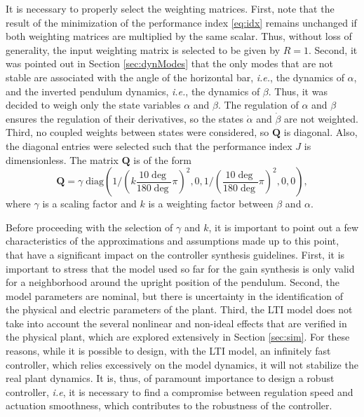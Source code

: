 \documentclass[letterpaper, 10 pt, conference]{ieeeconf}
\begin{document}
It is necessary to properly select the weighting matrices. First, note that the result of the minimization of the performance index \eqref{eq:idx} remains unchanged if both weighting matrices are multiplied by the same scalar. Thus, without loss of generality, the input weighting matrix is selected to be given by $R = 1$. Second, it was pointed out in Section \ref{sec:dynModes} that the only modes that are not stable are associated with the angle of the horizontal bar, \textit{i.e.}, the dynamics of $\alpha$, and the inverted pendulum dynamics, \textit{i.e.}, the dynamics of $\beta$. Thus, it was decided to weigh only the state variables $\alpha$ and $\beta$. The regulation of $\alpha$ and $\beta$ ensures the regulation of their derivatives, so the states $\dot{\alpha}$ and $\dot{\beta}$ are not weighted. Third, no coupled weights between states were considered, so $\mathbf{Q}$ is diagonal. Also, the diagonal entries were selected such that the performance index $J$ is dimensionless. The matrix $\mathbf{Q}$ is of the form
\begin{equation*}
    \mathbf{Q}\!=\! \gamma\; \mathrm{diag}\!\!\left(1/{\left(k\frac{10\deg}{180 \deg} \pi\right)^2}\!\!,0,{1}/{\left(\frac{10\deg}{180 \deg} \pi\right)^2}\!\!,0,0\!\right),
\end{equation*}
where $\gamma$ is a scaling factor and $k$ is a weighting factor between $\beta$ and $\alpha$.

Before proceeding with the selection of $\gamma$ and $k$, it is important to point out a few characteristics of the approximations and assumptions made up to this point, that have a significant impact on the controller synthesis guidelines. First, it is important to stress that the model used so far for the gain synthesis is only valid for a neighborhood around the upright position of the pendulum. Second, the model parameters are nominal, but there is uncertainty in the identification of the physical and electric parameters of the plant. Third, the LTI model does not take into account the several nonlinear and non-ideal effects that are verified in the physical plant, which are explored extensively in Section \ref{sec:sim}. For these reasons, while it is possible to design, with the LTI model, an infinitely fast controller, which relies excessively on the model dynamics, it will not stabilize the real plant dynamics. It is, thus, of paramount importance to design a robust controller, \textit{i.e}, it is necessary to find a compromise between regulation speed and actuation smoothness, which contributes to the robustness of the controller.
\end{document}
